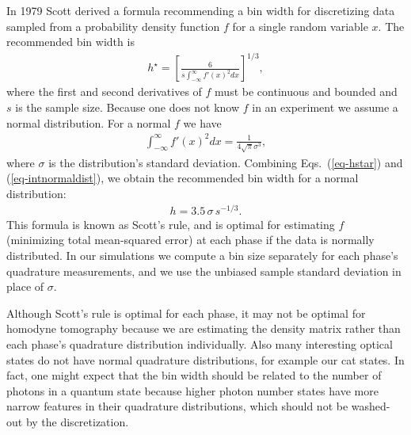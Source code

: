 \documentclass[
reprint,
superscriptaddress,
showpacs,
amsmath,
amssymb,
aps,
pra,
longbibliography
]{revtex4-1}
\begin{document}
In 1979 Scott derived a formula recommending a bin width for
discretizing data sampled from a probability density function $f$ for
a single random variable $x$. The recommended bin width is
\begin{eqnarray}
  h^{\star} = \left[ \frac{6}{s \int_{-\infty}^{\infty} f'(x)^2 dx} \right]^{1/3},
  \label{eq-hstar}
\end{eqnarray}
where the first and second derivatives of $f$ must be continuous and
bounded and $s$ is the sample size. Because one does not know $f$ in
an experiment we assume a normal distribution. For a normal $f$ we
have
\begin{eqnarray}
  \int_{-\infty}^{\infty} f'(x)^2 dx = \frac{1}{4 \sqrt{\pi} \sigma ^3},
  \label{eq-intnormaldist}
\end{eqnarray}
where $\sigma$ is the distribution's standard deviation.  Combining
Eqs.~(\ref{eq-hstar}) and (\ref{eq-intnormaldist}), we obtain the
recommended bin width for a normal distribution:
\begin{eqnarray}
  h = 3.5 \, \sigma \, s^{-1/3}.
  \label{eq-scott}
\end{eqnarray}
This formula is known as Scott's rule, and is optimal for 
  estimating $f$ (minimizing total mean-squared error) at each phase
if the data is normally distributed. In our simulations we compute a
bin size separately for each phase's quadrature measurements, and we
use the unbiased sample standard deviation in place of $\sigma$.

Although Scott's rule is optimal for each phase, it may not be optimal
for homodyne tomography because we are estimating the density matrix
rather than each phase's quadrature distribution individually.  Also
many interesting optical states do not have normal quadrature
distributions, for example our cat states.  In fact, one might expect
that the bin width should be related to the number of photons in a
quantum state because higher photon number states have more narrow
features in their quadrature distributions, which should not be
washed-out by the discretization.
\end{document}
